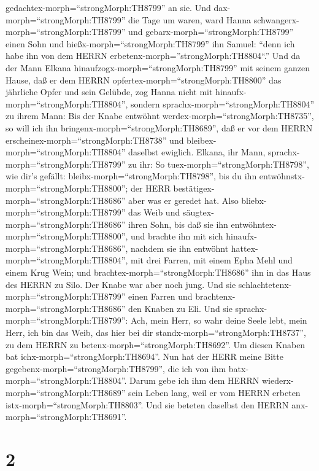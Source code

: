gedachtex-morph=``strongMorph:TH8799'' an sie.  Und
dax-morph=``strongMorph:TH8799'' die Tage um waren, ward Hanna
schwangerx-morph=``strongMorph:TH8799'' und
gebarx-morph=``strongMorph:TH8799'' einen Sohn und
hießx-morph=``strongMorph:TH8799'' ihn Samuel: ``denn ich habe ihn von
dem HERRN erbetenx-morph=''strongMorph:TH8804``.''  Und da
der Mann Elkana hinaufzogx-morph=``strongMorph:TH8799'' mit seinem
ganzen Hause, daß er dem HERRN opfertex-morph=``strongMorph:TH8800'' das
jährliche Opfer und sein Gelübde,  zog Hanna nicht mit
hinaufx-morph=``strongMorph:TH8804'', sondern
sprachx-morph=``strongMorph:TH8804'' zu ihrem Mann: Bis der Knabe
entwöhnt werdex-morph=``strongMorph:TH8735'', so will ich ihn
bringenx-morph=``strongMorph:TH8689'', daß er vor dem HERRN
erscheinex-morph=``strongMorph:TH8738'' und
bleibex-morph=``strongMorph:TH8804'' daselbst ewiglich. 
Elkana, ihr Mann, sprachx-morph=``strongMorph:TH8799'' zu ihr: So
tuex-morph=``strongMorph:TH8798'', wie dir's gefällt:
bleibx-morph=``strongMorph:TH8798'', bis du ihn
entwöhnstx-morph=``strongMorph:TH8800''; der HERR
bestätigex-morph=``strongMorph:TH8686'' aber was er geredet hat. Also
bliebx-morph=``strongMorph:TH8799'' das Weib und
säugtex-morph=``strongMorph:TH8686'' ihren Sohn, bis daß sie ihn
entwöhntex-morph=``strongMorph:TH8800'',  und brachte ihn
mit sich hinaufx-morph=``strongMorph:TH8686'', nachdem sie ihn entwöhnt
hattex-morph=``strongMorph:TH8804'', mit drei Farren, mit einem Epha
Mehl und einem Krug Wein; und brachtex-morph=``strongMorph:TH8686'' ihn
in das Haus des HERRN zu Silo. Der Knabe war aber noch jung.
 Und sie schlachtetenx-morph=``strongMorph:TH8799'' einen
Farren und brachtenx-morph=``strongMorph:TH8686'' den Knaben zu Eli.
 Und sie sprachx-morph=``strongMorph:TH8799'': Ach, mein
Herr, so wahr deine Seele lebt, mein Herr, ich bin das Weib, das hier
bei dir standx-morph=``strongMorph:TH8737'', zu dem HERRN zu
betenx-morph=``strongMorph:TH8692''.  Um diesen Knaben bat
ichx-morph=``strongMorph:TH8694''. Nun hat der HERR meine Bitte
gegebenx-morph=``strongMorph:TH8799'', die ich von ihm
batx-morph=``strongMorph:TH8804''.  Darum gebe ich ihm dem
HERRN wiederx-morph=``strongMorph:TH8689'' sein Leben lang, weil er vom
HERRN erbeten istx-morph=``strongMorph:TH8803''. Und sie beteten
daselbst den HERRN anx-morph=``strongMorph:TH8691''.

\hypertarget{section-1}{%
\section{2}\label{section-1}}

